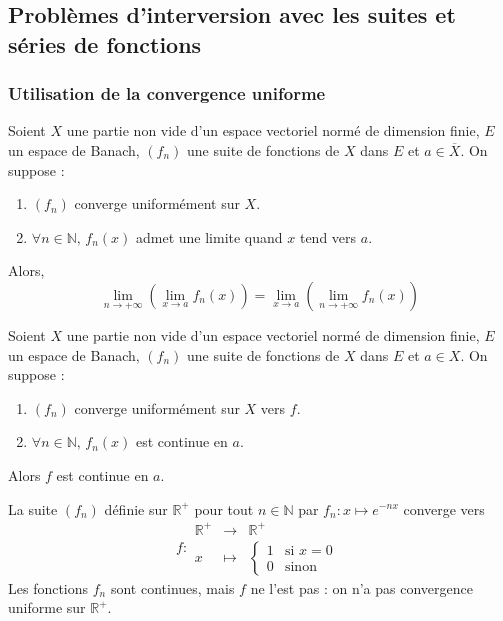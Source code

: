 



  \subsection{Problèmes d'interversion avec les suites et séries de fonctions}

  \subsubsection{Utilisation de la convergence uniforme}


  \begin{theorem}
    Soient $X$ une partie non vide d'un espace vectoriel normé de dimension finie, $E$ un espace de Banach, $(f_n)$ une suite de fonctions de $X$ dans $E$ et $a \in \overline{X}$. On suppose :
    \begin{enumerate}[label=(\roman*)]
      \item $(f_n)$ converge uniformément sur $X$.
      \item $\forall n \in \mathbb{N}, \, f_n(x)$ admet une limite quand $x$ tend vers $a$.
    \end{enumerate}
    Alors,
    \[ \lim_{n \rightarrow +\infty} \left( \lim_{x \rightarrow a} f_n(x) \right) = \lim_{x \rightarrow a} \left( \lim_{n \rightarrow +\infty} f_n(x) \right) \]
  \end{theorem}

  \begin{theorem}
    Soient $X$ une partie non vide d'un espace vectoriel normé de dimension finie, $E$ un espace de Banach, $(f_n)$ une suite de fonctions de $X$ dans $E$ et $a \in X$. On suppose :
    \begin{enumerate}[label=(\roman*)]
      \item $(f_n)$ converge uniformément sur $X$ vers $f$.
      \item $\forall n \in \mathbb{N}, \, f_n(x)$ est continue en $a$.
    \end{enumerate}
    Alors $f$ est continue en $a$.
  \end{theorem}

  \begin{example}
    La suite $(f_n)$ définie sur $\mathbb{R}^+$ pour tout $n \in \mathbb{N}$ par $f_n : x \mapsto e^{-nx}$ converge vers
    \[
      f :
      \begin{array}{ccc}
        \mathbb{R}^+ &\rightarrow& \mathbb{R}^+ \\
        x &\mapsto& \begin{cases}
          1 &\text{si } x = 0 \\
          0 &\text{sinon}
        \end{cases}
      \end{array}
    \]
    Les fonctions $f_n$ sont continues, mais $f$ ne l'est pas : on n'a pas convergence uniforme sur $\mathbb{R}^+$.
  \end{example}

